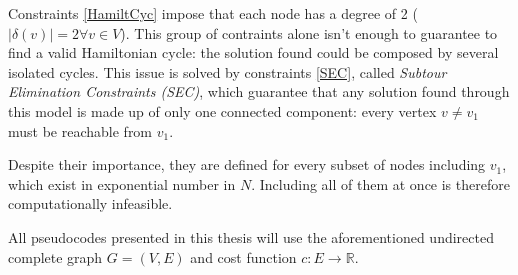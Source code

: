 Constraints \ref{HamiltCyc} impose that each node has a degree of 2 ($|\delta(v)| = 2 \forall v\in V$). This group of contraints alone isn't enough to guarantee to find a valid Hamiltonian cycle: the solution found could be composed by several isolated cycles. This issue is solved by constraints \ref{SEC}, called \textit{Subtour Elimination Constraints (SEC)}, which guarantee that any solution found through this model is made up of only one connected component: every vertex $v\neq v_1$ must be reachable from $v_1$.

Despite their importance, they are defined for every subset of nodes including $v_1$, which exist in exponential number in $N$. Including all of them at once is therefore computationally infeasible.

All pseudocodes presented in this thesis will use the aforementioned undirected complete graph $G=(V,E)$ and cost function $c:E\rightarrow\mathbb{R}$.